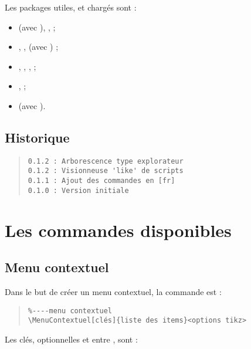 \documentclass[11pt,a4paper]{ltxdoc}
\begin{document}
Les packages utiles, et chargés sont :

\begin{itemize}
	\item {} (avec ), ,  ;
	\item {}, ,  (avec ) ;
	\item {}, , ,  ;
	\item {},  ;
	\item {} (avec ).
\end{itemize}

\vfill

\subsection{Historique}

\begin{quote}
\begin{verbatim}
0.1.2 : Arborescence type explorateur
0.1.2 : Visionneuse 'like' de scripts
0.1.1 : Ajout des commandes en [fr]
0.1.0 : Version initiale
\end{verbatim}
\end{quote}

\pagebreak

\section{Les commandes disponibles}

\subsection{Menu contextuel}

Dans le but de créer un menu contextuel, la commande est :

\begin{quote}
\begin{verbatim}
%----menu contextuel
\MenuContextuel[clés]{liste des items}<options tikz>
\end{verbatim}
\end{quote}

Les \textsf{clés}, optionnelles et entre \MontreCode{[...]}, sont :
\end{document}
